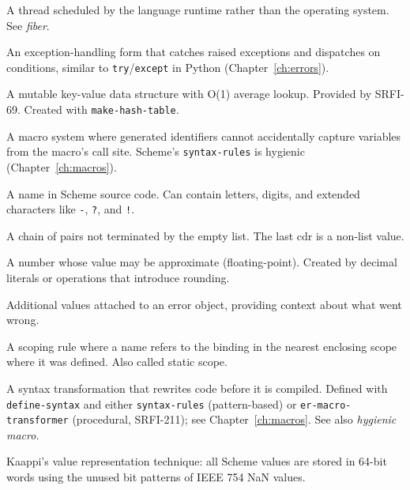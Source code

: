 \begin{description}[leftmargin=2em, style=nextline]
\item[green thread]
A thread scheduled by the language runtime rather than the operating system. See \emph{fiber}.

\item[guard clause]
An exception-handling form that catches raised exceptions and dispatches on conditions, similar to \texttt{try}/\texttt{except} in Python (Chapter~\ref{ch:errors}).

\item[hash table]
A mutable key-value data structure with O(1) average lookup. Provided by SRFI-69. Created with \texttt{make-hash-table}.

\item[hygienic macro]
A macro system where generated identifiers cannot accidentally capture variables from the macro's call site. Scheme's \texttt{syntax-rules} is hygienic (Chapter~\ref{ch:macros}).

\item[identifier]
A name in Scheme source code. Can contain letters, digits, and extended characters like \texttt{-}, \texttt{?}, and \texttt{!}.

\item[improper list]
A chain of pairs not terminated by the empty list. The last cdr is a non-list value.

\item[inexact]
A number whose value may be approximate (floating-point). Created by decimal literals or operations that introduce rounding.

\item[irritants]
Additional values attached to an error object, providing context about what went wrong.

\item[lexical scope]
A scoping rule where a name refers to the binding in the nearest enclosing scope where it was defined. Also called static scope.

\item[macro]
A syntax transformation that rewrites code before it is compiled. Defined with \texttt{define-syntax} and either \texttt{syntax-rules} (pattern-based) or \texttt{er-macro-transformer} (procedural, SRFI-211); see Chapter~\ref{ch:macros}. See also \emph{hygienic macro}.

\item[NaN-boxing]
Kaappi's value representation technique: all Scheme values are stored in 64-bit words using the unused bit patterns of IEEE 754 NaN values.


\end{description}
